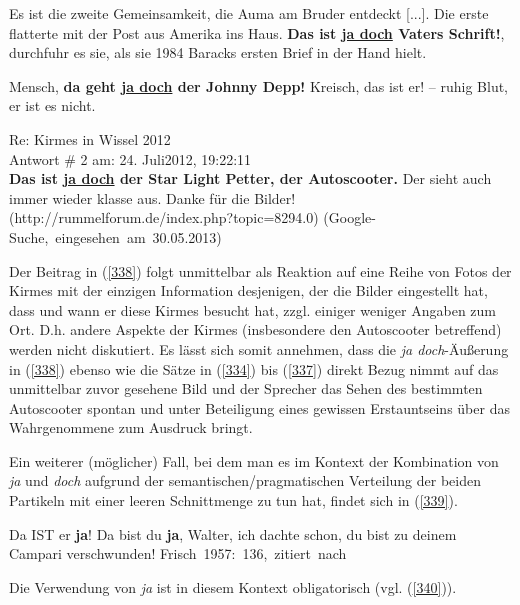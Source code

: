 \begin{exe}
	\ex\label{336}
	\scriptsize 
	Es ist die zweite Gemeinsamkeit, die Auma am Bruder entdeckt [...]. Die erste flatterte mit der Post aus Amerika ins Haus. \glqq \textbf{Das ist 			\underline{ja doch} Vaters Schrift!}\grqq{}, durchfuhr es sie, als sie 1984 Baracks ersten Brief in der Hand hielt.
\end{exe}
	
\begin{exe}
	\ex\label{337}
	\scriptsize 
	Mensch, \textbf{da geht \underline{ja doch} der Johnny Depp!} Kreisch, das ist er! – ruhig Blut, er ist es nicht.
\end{exe}

\begin{exe}
	\ex\label{338}
	\scriptsize 
	Re: Kirmes in Wissel 2012\\
	\glqq Antwort \# 2 am: 24. Juli2012, 19:22:11\grqq{}\\
	\textbf{Das ist \underline{ja doch} der Star Light Petter, der Autoscooter.} Der sieht auch immer wieder klasse aus. Danke für die Bilder!	
	\hfill\hbox{(http://rummelforum.de/index.php?topic=8294.0)}
	\newline	
	\hbox{}\hfill\hbox{(Google-Suche, eingesehen am 30.05.2013)}	
\end{exe}									       
Der Beitrag in (\ref{338}) folgt unmittelbar als Reaktion auf eine Reihe von Fotos der Kirmes mit der einzigen Information desjenigen, der die Bilder eingestellt hat, dass und wann er diese Kirmes besucht hat, zzgl. einiger weniger Angaben zum Ort. D.h. andere Aspekte der Kirmes (insbesondere den Autoscooter betreffend) werden nicht diskutiert. Es lässt sich somit annehmen, dass die \textit{ja doch}-Äußerung in (\ref{338}) ebenso wie die Sätze in (\ref{334}) bis (\ref{337}) direkt Bezug nimmt auf das unmittelbar zuvor gesehene Bild und der Sprecher das Sehen des bestimmten Autoscooter spontan und unter Beteiligung eines gewissen Erstauntseins über das Wahrgenommene zum Ausdruck bringt.

Ein weiterer (möglicher) Fall, bei dem man es im Kontext der Kombination von \textit{ja} und \textit{doch} aufgrund der semantischen/pragmatischen Verteilung der beiden Partikeln mit einer leeren Schnittmenge zu tun hat, findet sich in (\ref{339}).

\begin{exe}
	\ex\label{339} 
		\begin{xlist}	
			\ex\label{339a} Da IST er \textbf{ja}!
			\ex\label{339b} \glqq Da bist du \textbf{ja}, Walter, ich dachte schon, du bist zu deinem Campari verschwunden!\grqq{}  	         
			\hfill\hbox {Frisch 1957: 136, zitiert nach \citet[167]{Rinas2006}}
		\end{xlist}
\end{exe}										      	     
Die Verwendung von \textit{ja} ist in diesem Kontext obligatorisch (vgl. (\ref{340})). 

